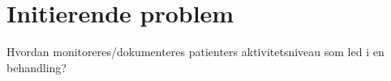 

\section{Initierende problem}
Hvordan monitoreres/dokumenteres patienters aktivitetsniveau som led i en behandling?  
